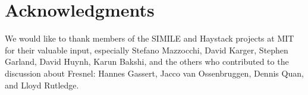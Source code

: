 \documentclass{llncs}
\begin{document}


%








\section*{Acknowledgments}

\vspace{-1mm}

\begin{small}
We would like to thank members of the SIMILE and Haystack projects at MIT for their valuable input, especially Stefano Mazzocchi, David Karger, Stephen Garland, David Huynh, Karun Bakshi, and the others who contributed to the discussion about Fresnel: Hannes Gassert, Jacco van Ossenbruggen, Dennis Quan, and Lloyd Rutledge.
\end{small}

\vspace{-3mm}

%
%



\end{document}
